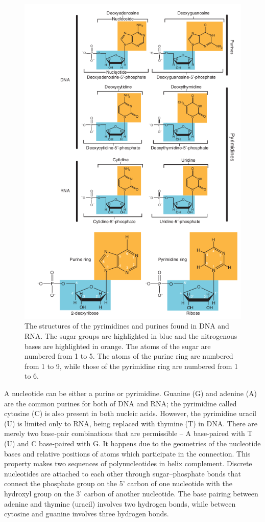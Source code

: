 \begin{figure}[!ht]
	\centering
	\includegraphics[width=.9\textwidth]{figures/bases}
	\caption{The structures of the pyrimidines and purines found in DNA and RNA. The sugar groups are highlighted in blue and the nitrogenous bases are highlighted in orange. The atoms of the sugar are numbered from 1 to 5. The atoms of the purine ring are numbered from 1 to 9, while those of the pyrimidine ring are numbered from 1 to 6. \label{o:latex_friendly_zone}}
\end{figure}

A nucleotide can be either a purine or pyrimidine. Guanine (G) and adenine (A)  are the common purines for both of DNA and RNA; the pyrimidine called cytosine (C) is also present in both nucleic acids. However, the pyrimidine uracil (U) is limited only to RNA, being replaced with thymine (T) in DNA. There are merely two base-pair combinations that are permissible – A base-paired with T (U) and C base-paired with G. It happens due to the geometries of the nucleotide bases and relative positions of atoms which participate in the connection. This property makes two sequences of polynucleotides in helix complement. Discrete nucleotides are attached to each other through sugar–phosphate bonds that connect the phosphate group on the 5’ carbon of one nucleotide with the hydroxyl group on the 3’ carbon of another nucleotide. The base pairing between adenine and thymine (uracil) involves two hydrogen bonds, while between cytosine and guanine involves three hydrogen bonds.
